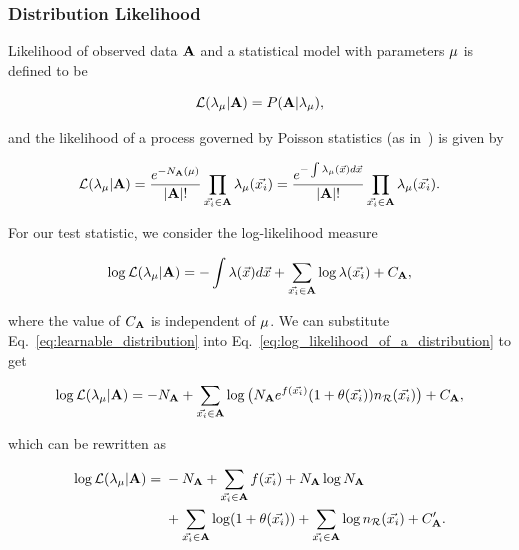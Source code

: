 \documentclass[../../ddppaper2.tex]{subfiles}
\begin{document}
\subsubsection{Distribution Likelihood}

Likelihood of observed data $\dataset{A}$ and a statistical model with parameters $\param$ is defined to be

\begin{equation}
    \likelihood(\lambda_{\param} | \dataset{A}) = P(\dataset{A} | \lambda_{\param}),
\end{equation}

\noindent and the likelihood of a process governed by Poisson statistics (as in~\cite{LastDDPPaper}) is given by

\begin{equation}
\label{eq:likelihood_of_a_distribution}
    \likelihood(\lambda_{\param} | \dataset{A})
    = \dfrac{e^{-N_{\dataset{A}}(\param)}}{\abs{\dataset{A}}!}
    \prod\limits_{\event \in \dataset{A}}\lambda_{\param}(\event)
    = \dfrac{e^{-\int \lambda_\param(\anyevent) d\anyevent}}{\abs{\dataset{A}}!}
    \prod\limits_{\event \in \dataset{A}}\lambda_{\param}(\event).
\end{equation}

For our test statistic, we consider the log-likelihood measure

\begin{equation}
\label{eq:log_likelihood_of_a_distribution}
    \llikelihood( \lambda_\param | \dataset{A}) = -\int \lambda(\anyevent)d\anyevent + \sum_{\event \in \dataset{A}} \log\lambda(\event) + C_\dataset{A},
\end{equation}

\noindent where the value of $C_{\dataset{A}}$ is independent of $\param$. We can substitute Eq.~\ref{eq:learnable_distribution} into Eq.~\ref{eq:log_likelihood_of_a_distribution} to get

\begin{equation}
    \llikelihood( \lambda_\param | \dataset{A}) = -N_{\dataset{A}} + \sum_{\event \in \dataset{A}} \log\big({N}_{\dataset{A}} e^{f(\event)} (1 + \nparam(\event)) \refdist[\event]\big) + C_\dataset{A},
\end{equation}

\noindent which can be rewritten as

\begin{equation}
\label{eq:log_likelihood_of_a_learnable_distribution}
\begin{aligned}
    \llikelihood( \lambda_\param | \dataset{A}) ={}&
    -N_{\dataset{A}}
    + \sum_{\event \in \dataset{A}} f(\event)
    + N_{\dataset{A}}\log{N_{\dataset{A}}} \\&
    + \sum_{\event \in \dataset{A}} \log(1 + \nparam(\event))
    + \sum_{\event \in \dataset{A}} \log \refdist[\event]
    + C'_\dataset{A}.
\end{aligned}
\end{equation}
\end{document}
